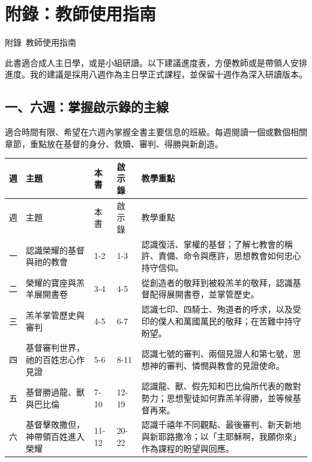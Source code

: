 
\renewcommand{\appendixname}{附錄}
\renewcommand{\thechapter}{\arabic{chapter}}
\renewcommand{\thefigure}{\appendixname~\thechapter.\arabic{figure}}  %

\chapter*{附錄：教師使用指南}
%
  {\appendixname~\thechapter\quad 教師使用指南}



此書適合成人主日學，或是小組研讀。以下建議進度表，方便教師或是帶領人安排進度。我的建議是採用八週作為主日學正式課程，並保留十週作為深入研讀版本。 

\section*{一、六週：掌握啟示錄的主線}

適合時間有限、希望在六週內掌握全書主要信息的班級。每週閱讀一個或數個相關章節，重點放在基督的身分、救贖、審判、得勝與新創造。
{
\renewcommand{\arraystretch}{1}
\begin{longtable}{
  >{\centering\arraybackslash}p{0.5cm}
  p{2cm}
  p{1cm}
  p{1.5cm}
  p{4cm}
}
週 &
主題 &
本書 &
啟示錄 &
教學重點 \\
\hline
\endfirsthead

週 &
主題 &
本書 &
啟示錄 &
教學重點 \\
\hline
\endhead

一 &
認識榮耀的基督與祂的教會 &
1-2 &
1-3 &
認識復活、掌權的基督；了解七教會的稱許、責備、命令與應許，思想教會如何忠心持守信仰。 \\

二 &
榮耀的寶座與羔羊展開書卷 &
3-4 &
4-5 &
從創造者的敬拜到被殺羔羊的敬拜，認識基督配得展開書卷，並掌管歷史。 \\

三 &
羔羊掌管歷史與審判 &
4-5 &
6-7 &
認識七印、四騎士、殉道者的呼求，以及受印的僕人和萬國萬民的敬拜；在苦難中持守盼望。 \\

四 &
基督審判世界，祂的百姓忠心作見證 &
5-6 &
8-11 &
認識七號的審判、兩個見證人和第七號，思想神的審判、憐憫與教會的見證使命。 \\

五 &
基督勝過龍、獸與巴比倫 &
7-10 &
12-19 &
認識龍、獸、假先知和巴比倫所代表的敵對勢力；思想聖徒如何靠羔羊得勝，並等候基督再來。 \\

六 &
基督擊敗撒但，神帶領百姓進入榮耀 &
11-12 &
20-22 &
認識千禧年不同觀點、最後審判、新天新地與新耶路撒冷；以「主耶穌啊，我願你來」作為課程的盼望與回應。 \\

\end{longtable}
}

